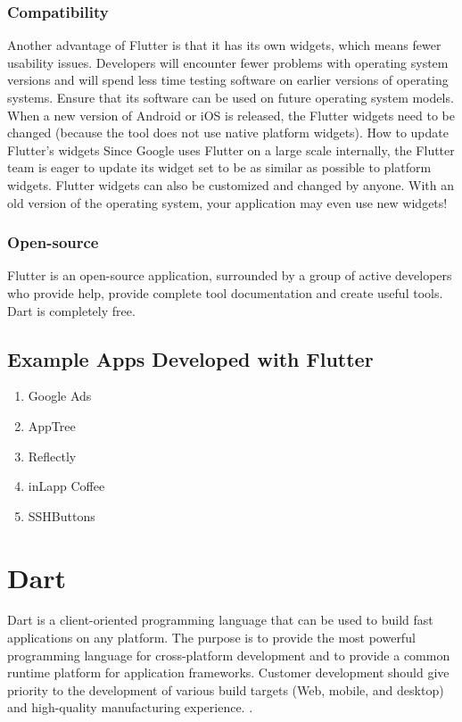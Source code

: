 \subsubsection{Compatibility}
Another advantage of Flutter is that it has its own widgets, which means fewer usability issues. Developers will encounter fewer problems with operating system versions and will spend less time testing software on earlier versions of operating systems. Ensure that its software can be used on future operating system models. When a new version of Android or iOS is released, the Flutter widgets need to be changed (because the tool does not use native platform widgets). How to update Flutter's widgets Since Google uses Flutter on a large scale internally, the Flutter team is eager to update its widget set to be as similar as possible to platform widgets. Flutter widgets can also be customized and changed by anyone. With an old version of the operating system, your application may even use new widgets!
\subsubsection{Open-source}
Flutter is an open-source application, surrounded by a group of active developers who provide help, provide complete tool documentation and create useful tools. Dart is completely free.

\subsection{Example Apps Developed with Flutter}
\begin{enumerate}
    \item Google Ads
    \item AppTree
    \item Reflectly
    \item inLapp Coffee
    \item SSHButtons
\end{enumerate}

\section{Dart}
Dart is a client-oriented programming language that can be used to build fast applications on any platform. The purpose is to provide the most powerful programming language for cross-platform development and to provide a common runtime platform for application frameworks. Customer development should give priority to the development of various build targets (Web, mobile, and desktop)  and high-quality manufacturing experience. \cite{DartDev5:online}.

